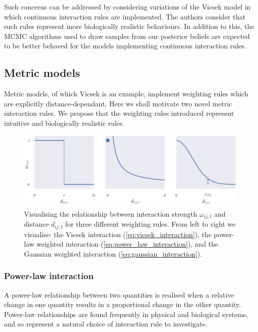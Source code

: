 Such concerns can be addressed by considering variations of the Vicsek model in which
continuous interaction rules are implemented. The authors consider that such rules
represent more biologically realistic behaviours. In addition to this, the MCMC algorithms
used to draw samples from our posterior beliefs are expected to be better behaved for the
models implementing continuous interaction rules.

\subsection{Metric models}

Metric models, of which Vicsek is an example, implement weighting rules which are
explicitly distance-dependant. Here we shall motivate two novel metric interaction
rules. We propose that the weighting rules introduced represent intuitive and biologically
realistic rules.

\begin{figure}[tb]
    \includegraphics{weighting_rules.pdf}
    \caption{Visualising the relationship between interaction strength $\omega_{ij,t}$ and
        distance $d_{ij,t}$ for three different weighting rules. From left to right we
        visualise: the Vicsek interaction (\cref{eq:vicsek_interaction}), the power-law
        weighted interaction (\cref{eq:power_law_interaction}), and the Gaussian weighted
    interaction (\cref{eq:gaussian_interaction}).}
\end{figure}

\subsubsection{Power-law interaction}

A power-law relationship between two quantities is realised when a relative change in
one quantity results in a proportional change in the other quantity. Power-law
relationships are found frequently in physical and biological systems, and so represent a
natural choice of interaction rule to investigate.


